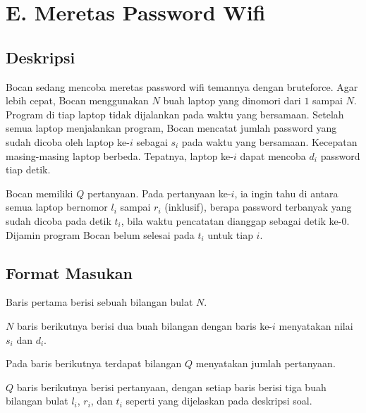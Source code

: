 \documentclass{article}
\begin{document}
\section*{\hfil E. Meretas Password Wifi\hfil}


\subsection*{Deskripsi}

\par\noindent Bocan sedang mencoba meretas password wifi temannya dengan bruteforce. Agar lebih cepat, Bocan menggunakan $N$ buah laptop yang dinomori dari $1$ sampai $N$. Program di tiap laptop tidak dijalankan pada waktu yang bersamaan. Setelah semua laptop menjalankan program, Bocan mencatat jumlah password yang sudah dicoba oleh laptop ke-$i$ sebagai $s_i$ pada waktu yang bersamaan. Kecepatan masing-masing laptop berbeda. Tepatnya, laptop ke-$i$ dapat mencoba $d_i$ password tiap detik.

\par\noindent Bocan memiliki $Q$ pertanyaan. Pada pertanyaan ke-$i$, ia ingin tahu di antara semua laptop bernomor $l_i$ sampai $r_i$ (inklusif), berapa password terbanyak yang sudah dicoba pada detik $t_i$, bila waktu pencatatan dianggap sebagai detik ke-$0$. Dijamin program Bocan belum selesai pada $t_i$ untuk tiap $i$.

\subsection*{Format Masukan}

\par\noindent Baris pertama berisi sebuah bilangan bulat $N$.
\par\noindent $N$ baris berikutnya berisi dua buah bilangan dengan baris ke-$i$ menyatakan nilai $s_i$ dan $d_i$.
\par\noindent Pada baris berikutnya terdapat bilangan $Q$ menyatakan jumlah pertanyaan.
\par\noindent $Q$ baris berikutnya berisi pertanyaan, dengan setiap baris berisi tiga buah bilangan bulat $l_i$, $r_i$, dan $t_i$ seperti yang dijelaskan pada deskripsi soal.
\end{document}
